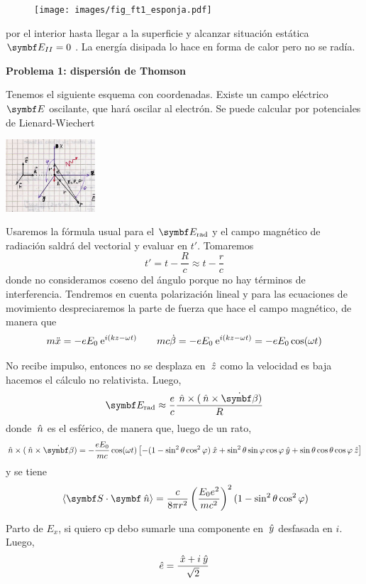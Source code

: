 \documentclass[10pt,oneside]{CBFT_book}
\begin{document}
\begin{figure}[htb]
	\begin{center}
	\texttt{[image: images/fig\_ft1\_esponja.pdf]}	 
	\end{center}
	\caption{}
\end{figure} 

por el interior hasta llegar a la superficie y alcanzar situación estática $\vb{E}_{II} = 0$ .
La energía disipada lo hace en forma de calor pero no se radía.

\begin{ejemplo}{\bf Problema 1: dispersión de Thomson}

Tenemos el siguiente esquema con coordenadas. Existe un campo eléctrico $\vb E$ oscilante, que
hará oscilar al electrón.
Se puede calcular por potenciales de Lienard-Wiechert

\includegraphics[width=0.25\textwidth]{images/fig_ft1_proble_thomson1.jpg}

Usaremos la fórmula usual para el $\vb E_\text{rad}$ y el campo magnético de radiación saldrá
del vectorial y evaluar en $t'$. Tomaremos
\[
	t' = t - \frac R c \approx t - \frac r c
\]
donde no consideramos coseno del ángulo porque no hay términos de interferencia.
Tendremos en cuenta polarización lineal y para las ecuaciones de movimiento despreciaremos la
parte de fuerza que hace el campo magnético, de manera que
\[
	m\ddot{x} = -e E_0 \:\mathrm{e}^{i(kz-\omega t)} \qquad 
	m c \dot{\beta} = -e E_0 \:\mathrm{e}^{i(kz-\omega t)} = -e E_0 \cos(\omega t)
\]

No recibe impulso, entonces no se desplaza en $\:\hat{z}$ como la velocidad es baja hacemos el 
cálculo no relativista. Luego,
\[
	\vb{E}_\text{rad} \approx \frac{e}{c} \frac{\nver \times (\nver \times \dot{\vb{\beta}})}{R}
\]
donde $\:\hat{n}$ es el esférico, de manera que, luego de un rato,
\[
	\nver \times (\nver \times \dot{\vb{\beta}}) =
	-\frac{eE_0}{mc}\cos(\omega t)
	\left[ 
	-( 1 - \sin^2\theta \cos^2\vp )\xver + 
	\sin^2\theta \sin\vp \cos\vp \yver + 
	\sin\theta \cos\theta \cos\vp \zver
	\right]
\]
y se tiene 
\[
	\vm{\pe{S}{\nver}} = \frac{c}{8\pi r^2} \Frac{E_0 e^2}{mc^2}^2( 1 - \sin^2\theta \cos^2\vp )
\]

Parto de $E_x$, si quiero cp debo sumarle una componente en $\:\hat{y}$ desfasada en $i$. Luego,
\[
	\hat{e} = \frac{\:\hat{x} + i\:\hat{y} }{\sqrt{2}}
\]


\end{ejemplo}
\end{document}
